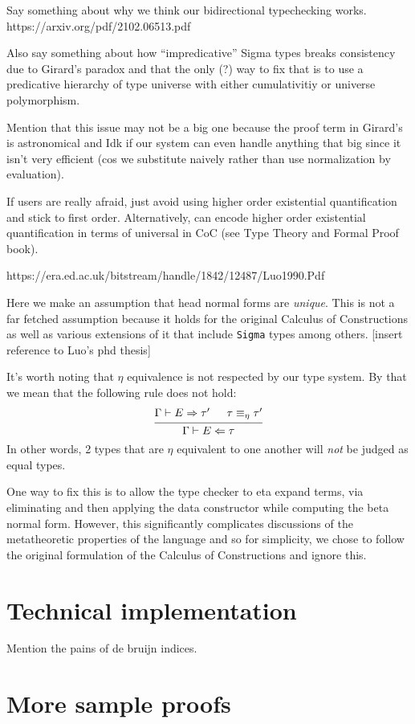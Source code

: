 \documentclass{article}
\begin{document}
Say something about why we think our bidirectional typechecking works.
https://arxiv.org/pdf/2102.06513.pdf

Also say something about how ``impredicative'' Sigma types breaks consistency
due to Girard's paradox and that the only (?) way to fix that is to use a 
predicative hierarchy of type universe with either cumulativitiy or universe
polymorphism.

Mention that this issue may not be a big one because the proof term in Girard's
is astronomical and Idk if our system can even handle anything that big since it
isn't very efficient (cos we substitute naively rather than use normalization
by evaluation).

If users are really afraid, just avoid using higher order existential
quantification and stick to first order. Alternatively, can encode higher order
existential quantification in terms of universal in CoC (see Type Theory and
Formal Proof book).

https://era.ed.ac.uk/bitstream/handle/1842/12487/Luo1990.Pdf



Here we make an assumption that head normal forms are \textit{unique}. 
This is not a far fetched assumption because it holds for the original Calculus
of Constructions as well as various extensions of it that include \verb|Sigma|
types among others. [insert reference to Luo's phd thesis]



It's worth noting that $\eta$ equivalence is not respected by our type system.
By that we mean that the following rule does not hold:
\[
  \begin{prooftree}
    \hypo{\Gamma \vdash E \Rightarrow \tau'}
    \hypo{\tau \equiv_{\eta} \tau'}
    \infer2{\Gamma \vdash E \Leftarrow \tau}
 \end{prooftree}
\]
In other words, 2 types that are $\eta$ equivalent to one another will 
\textit{not} be judged as equal types.

One way to fix this is to allow the type checker to eta expand terms, via
eliminating and then applying the data constructor while computing the beta
normal form. However, this significantly complicates discussions of the
metatheoretic properties of the language and so for simplicity, we chose to
follow the original formulation of the Calculus of Constructions and ignore
this.


\section{Technical implementation}
Mention the pains of de bruijn indices.

\section{More sample proofs}
\end{document}

